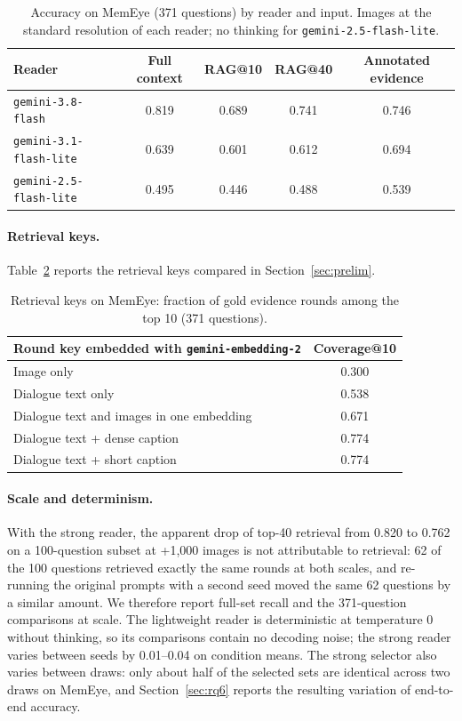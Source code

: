 \begin{table}[h]
\centering
\caption{Accuracy on MemEye (371 questions) by reader and input. Images at the standard resolution of each reader; no thinking for \texttt{gemini-2.5-flash-lite}.}
\label{tab:reader}
\small
\begin{tabular}{lcccc}
\toprule
Reader & Full context & RAG@10 & RAG@40 & Annotated evidence \\
\midrule
\texttt{gemini-3.8-flash} & 0.819 & 0.689 & 0.741 & 0.746 \\
\texttt{gemini-3.1-flash-lite} & 0.639 & 0.601 & 0.612 & 0.694 \\
\texttt{gemini-2.5-flash-lite} & 0.495 & 0.446 & 0.488 & 0.539 \\
\bottomrule
\end{tabular}
\end{table}

\paragraph{Retrieval keys.} Table~\ref{tab:keys} reports the retrieval keys compared in Section~\ref{sec:prelim}.

\begin{table}[h]
\centering
\caption{Retrieval keys on MemEye: fraction of gold evidence rounds among the top 10 (371 questions).}
\label{tab:keys}
\small
\begin{tabular}{lc}
\toprule
Round key embedded with \texttt{gemini-embedding-2} & Coverage@10 \\
\midrule
Image only & 0.300 \\
Dialogue text only & 0.538 \\
Dialogue text and images in one embedding & 0.671 \\
Dialogue text + dense caption & 0.774 \\
Dialogue text + short caption & 0.774 \\
\bottomrule
\end{tabular}
\end{table}

\paragraph{Scale and determinism.} With the strong reader, the apparent drop of top-40 retrieval from 0.820 to 0.762 on a 100-question subset at +1,000 images is not attributable to retrieval: 62 of the 100 questions retrieved exactly the same rounds at both scales, and re-running the original prompts with a second seed moved the same 62 questions by a similar amount. We therefore report full-set recall and the 371-question comparisons at scale. The lightweight reader is deterministic at temperature 0 without thinking, so its comparisons contain no decoding noise; the strong reader varies between seeds by 0.01--0.04 on condition means. The strong selector also varies between draws: only about half of the selected sets are identical across two draws on MemEye, and Section~\ref{sec:rq6} reports the resulting variation of end-to-end accuracy.

